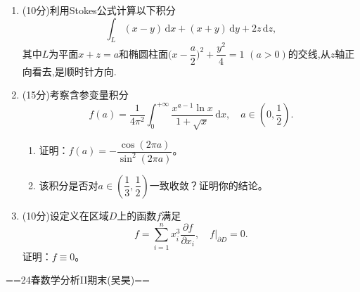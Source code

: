 \begin{enumerate}
\item[6](10分)利用Stokes公式计算以下积分
\[\int_{L}(x-y)\,\mathrm{d}x+(x+y)\,\mathrm{d}y+2z\,\mathrm{d}z,\]
其中$L$为平面$x+z=a$和椭圆柱面$\Big(x-\dfrac{a}{2}\Big)^{2}+\dfrac{y^{2}}{4}=1$ $(a>0)$的交线,从$z$轴正向看去,是顺时针方向.

\item[7](15分)考察含参变量积分
\[f(a)=\frac{1}{4\pi^{2}} \int_{0}^{+\infty}\frac{x^{a-1}\ln x}{1+\sqrt{x}}\,\mathrm{d}x, \quad a\in\left(0,\dfrac{1}{2}\right).\]
\begin{enumerate}
\item[(1)]证明：$f(a)=-\dfrac{\cos(2\pi a)}{\sin^{2}(2\pi a)}$。
\item[(2)]该积分是否对$a \in \left(\dfrac{1}{3},\dfrac{1}{2}\right)$一致收敛？证明你的结论。
\end{enumerate}

\item[8](10分)设定义在区域$D$上的函数$f$满足
\[f=\sum_{i=1}^{n}x_{i}^{3}\frac{\partial f}{\partial x_{i}}, \quad f\Big|_{\partial D}=0.\]
证明：$f\equiv 0$。
\end{enumerate}

==24春数学分析II期末(吴昊)==

